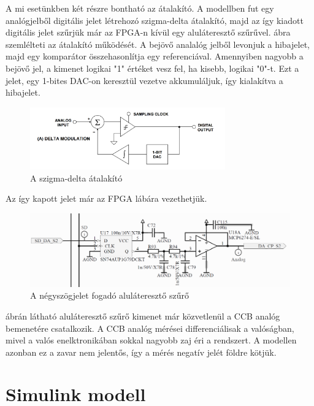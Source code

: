A mi esetünkben két részre bontható az átalakító. A modellben fut egy analógjelből digitális jelet létrehozó szigma-delta átalakító, majd az így kiadott digitális jelet szűrjük már az FPGA-n kívül egy aluláteresztő szűrűvel.  ábra szemlélteti az átalakító működését. A bejövő analalóg jelből levonjuk a hibajelet, majd egy komparátor összehasonlítja egy referenciával. Amennyiben nagyobb a bejövő jel, a kimenet logikai "1" értéket vesz fel, ha kisebb, logikai "0"-t. Ezt a jelet, egy 1-bites DAC-on keresztül vezetve akkumuláljuk, így kialakítva a hibajelet. 

\begin{figure}[!ht]
	\centering
	\includegraphics[width = 0.75\textwidth]{figures/sigmadelta.png}
	\caption{A szigma-delta átalakító} 
	\label{fig:sigmadelta}
\end{figure}

Az így kapott jelet már az FPGA lábára vezethetjük.

\begin{figure}[!ht]
	\centering
	\includegraphics[width = \textwidth]{figures/lowpassfilter.png}
	\caption{A négyszögjelet fogadó aluláteresztő szűrő} 
	\label{fig:lowpass}
\end{figure}

 ábrán látható aluláteresztő szűrő kimenet már közvetlenül a CCB analóg bemenetére csatalkozik. A CCB analóg mérései differenciálisak a valóságban, mivel a valós enelktronikában sokkal nagyobb zaj éri a rendszert. A modellen azonban ez a zavar nem jelentős, így a mérés negatív jelét földre kötjük.



\section{Simulink modell}

